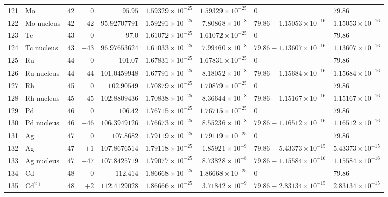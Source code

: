 {\begin{tabular}{@{}r l r r r r r l l@{}}
121 & Mo & 42 & $0$ & $95.95$ & $1.59329{\times}10^{-25}$ & $1.59329{\times}10^{-25}$ & $0$ & $79.86$ \\
122 & Mo nucleus & 42 & $+42$ & $95.92707791$ & $1.59291{\times}10^{-25}$ & $7.80868{\times}10^{-8}$ & $79.86 - 1.15053{\times}10^{-16}$ & $1.15053{\times}10^{-16}$ \\
123 & Tc & 43 & $0$ & $97.0$ & $1.61072{\times}10^{-25}$ & $1.61072{\times}10^{-25}$ & $0$ & $79.86$ \\
124 & Tc nucleus & 43 & $+43$ & $96.97653624$ & $1.61033{\times}10^{-25}$ & $7.99460{\times}10^{-8}$ & $79.86 - 1.13607{\times}10^{-16}$ & $1.13607{\times}10^{-16}$ \\
125 & Ru & 44 & $0$ & $101.07$ & $1.67831{\times}10^{-25}$ & $1.67831{\times}10^{-25}$ & $0$ & $79.86$ \\
126 & Ru nucleus & 44 & $+44$ & $101.0459948$ & $1.67791{\times}10^{-25}$ & $8.18052{\times}10^{-8}$ & $79.86 - 1.15684{\times}10^{-16}$ & $1.15684{\times}10^{-16}$ \\
127 & Rh & 45 & $0$ & $102.90549$ & $1.70879{\times}10^{-25}$ & $1.70879{\times}10^{-25}$ & $0$ & $79.86$ \\
128 & Rh nucleus & 45 & $+45$ & $102.8809436$ & $1.70838{\times}10^{-25}$ & $8.36644{\times}10^{-8}$ & $79.86 - 1.15167{\times}10^{-16}$ & $1.15167{\times}10^{-16}$ \\
129 & Pd & 46 & $0$ & $106.42$ & $1.76715{\times}10^{-25}$ & $1.76715{\times}10^{-25}$ & $0$ & $79.86$ \\
130 & Pd nucleus & 46 & $+46$ & $106.3949126$ & $1.76673{\times}10^{-25}$ & $8.55236{\times}10^{-8}$ & $79.86 - 1.16512{\times}10^{-16}$ & $1.16512{\times}10^{-16}$ \\
131 & Ag & 47 & $0$ & $107.8682$ & $1.79119{\times}10^{-25}$ & $1.79119{\times}10^{-25}$ & $0$ & $79.86$ \\
132 & Ag$^{+}$ & 47 & $+1$ & $107.8676514$ & $1.79118{\times}10^{-25}$ & $1.85921{\times}10^{-9}$ & $79.86 - 5.43373{\times}10^{-15}$ & $5.43373{\times}10^{-15}$ \\
133 & Ag nucleus & 47 & $+47$ & $107.8425719$ & $1.79077{\times}10^{-25}$ & $8.73828{\times}10^{-8}$ & $79.86 - 1.15584{\times}10^{-16}$ & $1.15584{\times}10^{-16}$ \\
134 & Cd & 48 & $0$ & $112.414$ & $1.86668{\times}10^{-25}$ & $1.86668{\times}10^{-25}$ & $0$ & $79.86$ \\
135 & Cd$^{2+}$ & 48 & $+2$ & $112.4129028$ & $1.86666{\times}10^{-25}$ & $3.71842{\times}10^{-9}$ & $79.86 - 2.83134{\times}10^{-15}$ & $2.83134{\times}10^{-15}$ \\

\end{tabular}}
